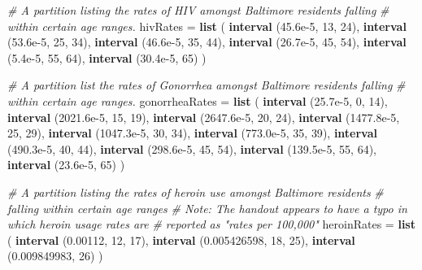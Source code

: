 \documentclass[]{article}
\newenvironment{Shaded}{}{}
\newcommand{\CommentTok}[1]{\textcolor[rgb]{0.38,0.63,0.69}{\textit{#1}}}
\newcommand{\DecValTok}[1]{\textcolor[rgb]{0.25,0.63,0.44}{#1}}
\newcommand{\FloatTok}[1]{\textcolor[rgb]{0.25,0.63,0.44}{#1}}
\newcommand{\KeywordTok}[1]{\textcolor[rgb]{0.00,0.44,0.13}{\textbf{#1}}}
\newcommand{\NormalTok}[1]{#1}
\newcommand{\StringTok}[1]{\textcolor[rgb]{0.25,0.44,0.63}{#1}}
\begin{document}
\begin{Shaded}
\begin{Highlighting}[]
\CommentTok{# A partition listing the rates of HIV amongst Baltimore residents falling}
\CommentTok{# within certain age ranges.}
\NormalTok{hivRates =}\StringTok{ }\KeywordTok{list}\NormalTok{ (}
  \KeywordTok{interval}\NormalTok{ (}\FloatTok{45.6e-5}\NormalTok{, }\DecValTok{13}\NormalTok{, }\DecValTok{24}\NormalTok{),}
  \KeywordTok{interval}\NormalTok{ (}\FloatTok{53.6e-5}\NormalTok{, }\DecValTok{25}\NormalTok{, }\DecValTok{34}\NormalTok{),}
  \KeywordTok{interval}\NormalTok{ (}\FloatTok{46.6e-5}\NormalTok{, }\DecValTok{35}\NormalTok{, }\DecValTok{44}\NormalTok{),}
  \KeywordTok{interval}\NormalTok{ (}\FloatTok{26.7e-5}\NormalTok{, }\DecValTok{45}\NormalTok{, }\DecValTok{54}\NormalTok{),}
  \KeywordTok{interval}\NormalTok{ (}\FloatTok{5.4e-5}\NormalTok{, }\DecValTok{55}\NormalTok{, }\DecValTok{64}\NormalTok{),}
  \KeywordTok{interval}\NormalTok{ (}\FloatTok{30.4e-5}\NormalTok{, }\DecValTok{65}\NormalTok{)}
\NormalTok{)}

\CommentTok{#  A partition list the rates of Gonorrhea amongst Baltimore residents falling}
\CommentTok{# within certain age ranges.}
\NormalTok{gonorrheaRates =}\StringTok{ }\KeywordTok{list}\NormalTok{ (}
  \KeywordTok{interval}\NormalTok{ (}\FloatTok{25.7e-5}\NormalTok{, }\DecValTok{0}\NormalTok{, }\DecValTok{14}\NormalTok{),}
  \KeywordTok{interval}\NormalTok{ (}\FloatTok{2021.6e-5}\NormalTok{, }\DecValTok{15}\NormalTok{, }\DecValTok{19}\NormalTok{),}
  \KeywordTok{interval}\NormalTok{ (}\FloatTok{2647.6e-5}\NormalTok{, }\DecValTok{20}\NormalTok{, }\DecValTok{24}\NormalTok{),}
  \KeywordTok{interval}\NormalTok{ (}\FloatTok{1477.8e-5}\NormalTok{, }\DecValTok{25}\NormalTok{, }\DecValTok{29}\NormalTok{),}
  \KeywordTok{interval}\NormalTok{ (}\FloatTok{1047.3e-5}\NormalTok{, }\DecValTok{30}\NormalTok{, }\DecValTok{34}\NormalTok{),}
  \KeywordTok{interval}\NormalTok{ (}\FloatTok{773.0e-5}\NormalTok{, }\DecValTok{35}\NormalTok{, }\DecValTok{39}\NormalTok{),}
  \KeywordTok{interval}\NormalTok{ (}\FloatTok{490.3e-5}\NormalTok{, }\DecValTok{40}\NormalTok{, }\DecValTok{44}\NormalTok{),}
  \KeywordTok{interval}\NormalTok{ (}\FloatTok{298.6e-5}\NormalTok{, }\DecValTok{45}\NormalTok{, }\DecValTok{54}\NormalTok{),}
  \KeywordTok{interval}\NormalTok{ (}\FloatTok{139.5e-5}\NormalTok{, }\DecValTok{55}\NormalTok{, }\DecValTok{64}\NormalTok{),}
  \KeywordTok{interval}\NormalTok{ (}\FloatTok{23.6e-5}\NormalTok{, }\DecValTok{65}\NormalTok{)}
\NormalTok{)}

\CommentTok{# A partition listing the rates of heroin use amongst Baltimore residents}
\CommentTok{# falling within certain age ranges}
\CommentTok{# Note: The handout appears to have a typo in which heroin usage rates are}
\CommentTok{# reported as "rates per 100,000"}
\NormalTok{heroinRates =}\StringTok{ }\KeywordTok{list}\NormalTok{ (}
  \KeywordTok{interval}\NormalTok{ (}\FloatTok{0.00112}\NormalTok{, }\DecValTok{12}\NormalTok{, }\DecValTok{17}\NormalTok{),}
  \KeywordTok{interval}\NormalTok{ (}\FloatTok{0.005426598}\NormalTok{, }\DecValTok{18}\NormalTok{, }\DecValTok{25}\NormalTok{),}
  \KeywordTok{interval}\NormalTok{ (}\FloatTok{0.009849983}\NormalTok{, }\DecValTok{26}\NormalTok{)}
\NormalTok{)}


\end{Highlighting}
\end{Shaded}
\end{document}

